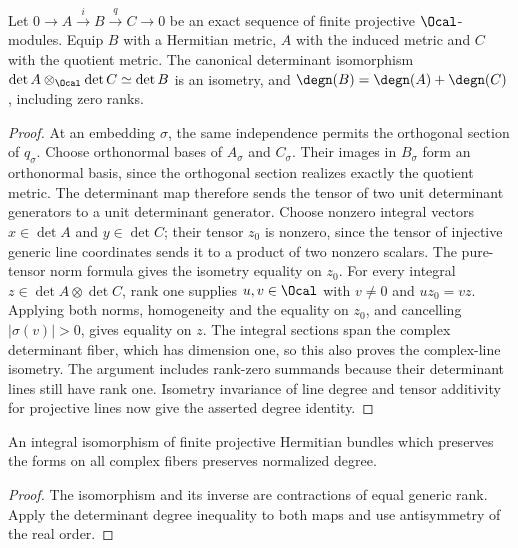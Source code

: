 \begin{lemma}
\label{lem:exact-determinant-degree}
\leanok
Let $0\to A\xrightarrow{i}B\xrightarrow{q}C\to0$ be an exact sequence
of finite projective $\Ocal$-modules. Equip $B$ with a Hermitian metric,
$A$ with the induced metric and $C$ with the quotient metric.
The canonical determinant isomorphism
$\det A\otimes_\Ocal\det C\simeq\det B$ is an isometry, and
$\degn(B)=\degn(A)+\degn(C)$, including zero ranks.
\end{lemma}
\begin{proof}
At an embedding $\sigma$, the same independence permits the orthogonal
section of $q_\sigma$. Choose orthonormal bases of $A_\sigma$ and
$C_\sigma$. Their images in $B_\sigma$ form an orthonormal basis, since
the orthogonal section realizes exactly the quotient metric. The
determinant map therefore sends the tensor of two unit determinant
generators to a unit determinant generator. Choose nonzero integral vectors $x\in\det A$ and $y\in\det C$;
their tensor $z_0$ is nonzero, since the tensor of injective generic line
coordinates sends it to a product of two nonzero scalars. The pure-tensor
norm formula gives the isometry equality on $z_0$. For every integral
$z\in\det A\otimes\det C$, rank one supplies $u,v\in\Ocal$ with
$v\ne0$ and $u z_0=v z$. Applying both norms, homogeneity and the equality
on $z_0$, and cancelling $|\sigma(v)|>0$, gives equality on $z$.
The integral sections span the complex determinant fiber, which has
dimension one, so this also proves the complex-line isometry. The argument
includes rank-zero summands because their determinant lines still have
rank one. Isometry invariance of line degree and tensor additivity for
projective lines now give the asserted degree identity.
\end{proof}

\begin{lemma}
\label{lem:degree-isometry}
\leanok
An integral isomorphism of finite projective Hermitian bundles which
preserves the forms on all complex fibers preserves normalized degree.
\end{lemma}
\begin{proof}
The isomorphism and its inverse are contractions of equal generic rank.
Apply the determinant degree inequality to both maps and use antisymmetry
of the real order.
\end{proof}

